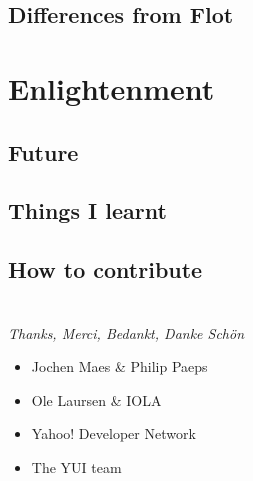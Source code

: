 \documentclass{beamer}
\begin{document}
\subsection{Differences from Flot}

\section{Enlightenment}
\subsection{Future}

\subsection{Things I learnt}

\subsection{How to contribute}

\section{}
\begin{frame}{\textit{Thanks, Merci, Bedankt, Danke Sch\"on}}
  \begin{itemize}
  \item Jochen Maes \& Philip Paeps
  \item Ole Laursen \& IOLA
  \item Yahoo! Developer Network
  \item The YUI team
  \end{itemize}
\end{frame}
\end{document}
